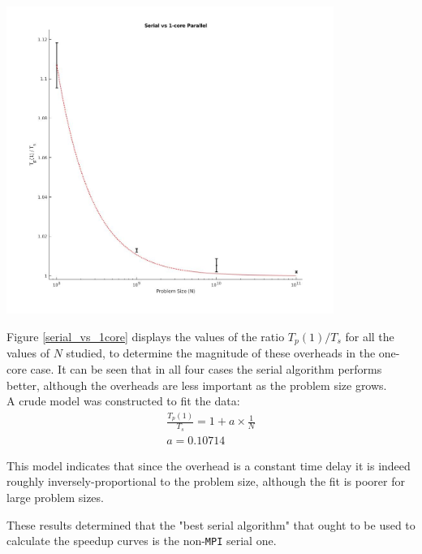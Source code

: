 \documentclass{article}
\begin{document}
\begin{minipage}{\linewidth}
\begin{minipage}{0.6\linewidth}
\includegraphics[width=0.8\textwidth]{serial_vs_1core}
\label{serial_vs_1core}
\end{minipage}
\begin{minipage}{0.4\linewidth}
Figure \ref{serial_vs_1core} displays the values of the ratio $T_p \left( 1 \right) / T_s $ for all the values of $N$ studied, to determine the magnitude of these overheads in the one-core case. It can be seen that in all four cases the serial algorithm performs better, although the overheads are less important as the problem size grows.\\
A crude model was constructed to fit the data:
\begin{gather*}
\frac{T_p \left( 1 \right) }{T_s} = 1 + a\times\frac{1}{N}	\\
a = 0.10714
\end{gather*}  

This model indicates that since the overhead is a constant time delay it is indeed roughly inversely-proportional to the problem size, although the fit is poorer for large problem sizes.

\end{minipage}

\end{minipage}


These results determined that the "best serial algorithm" that ought to be used to calculate the speedup curves is the non-\verb|MPI| serial one.
\end{document}
